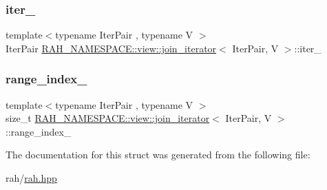 \subsubsection{\texorpdfstring{iter\_}{iter\_}}
{\footnotesize\ttfamily template$<$typename Iter\+Pair , typename V $>$ \\
Iter\+Pair \mbox{\hyperlink{struct_r_a_h___n_a_m_e_s_p_a_c_e_1_1view_1_1join__iterator}{R\+A\+H\+\_\+\+N\+A\+M\+E\+S\+P\+A\+C\+E\+::view\+::join\+\_\+iterator}}$<$ Iter\+Pair, V $>$\+::iter\+\_\+}

\mbox{\label{struct_r_a_h___n_a_m_e_s_p_a_c_e_1_1view_1_1join__iterator_a115eb3aea1bead65f13e62505315ee50}} 
\subsubsection{\texorpdfstring{range\_index\_}{range\_index\_}}
{\footnotesize\ttfamily template$<$typename Iter\+Pair , typename V $>$ \\
size\+\_\+t \mbox{\hyperlink{struct_r_a_h___n_a_m_e_s_p_a_c_e_1_1view_1_1join__iterator}{R\+A\+H\+\_\+\+N\+A\+M\+E\+S\+P\+A\+C\+E\+::view\+::join\+\_\+iterator}}$<$ Iter\+Pair, V $>$\+::range\+\_\+index\+\_\+}



The documentation for this struct was generated from the following file\+:\begin{DoxyCompactItemize}
\item 
rah/\mbox{\hyperlink{rah_8hpp}{rah.\+hpp}}\end{DoxyCompactItemize}
